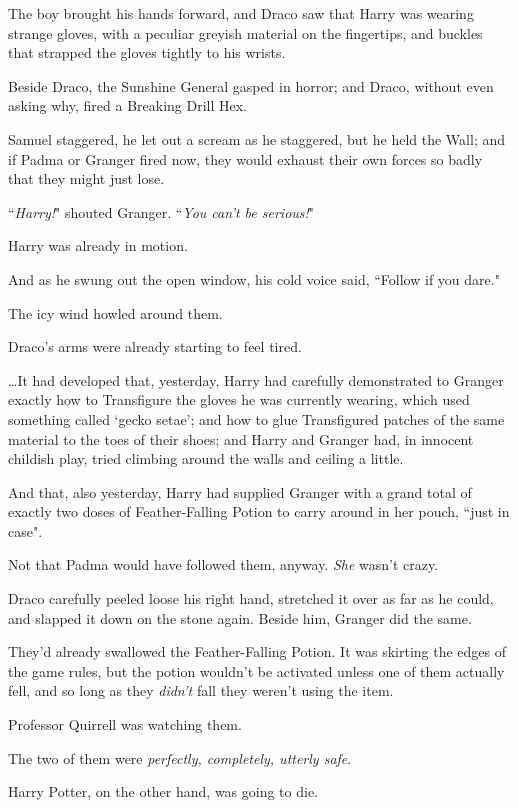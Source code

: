 The boy brought his hands forward, and Draco saw that Harry was wearing strange gloves, with a peculiar greyish material on the fingertips, and buckles that strapped the gloves tightly to his wrists.

Beside Draco, the Sunshine General gasped in horror; and Draco, without even asking why, fired a Breaking Drill Hex.

Samuel staggered, he let out a scream as he staggered, but he held the Wall; and if Padma or Granger fired now, they would exhaust their own forces so badly that they might just lose.

``\emph{Harry!}" shouted Granger. ``\emph{You can't be serious!}"

Harry was already in motion.

And as he swung out the open window, his cold voice said, ``Follow if you dare."

\later

The icy wind howled around them.

Draco's arms were already starting to feel tired.

{\ldots}It had developed that, yesterday, Harry had carefully demonstrated to Granger exactly how to Transfigure the gloves he was currently wearing, which used something called `gecko setae'; and how to glue Transfigured patches of the same material to the toes of their shoes; and Harry and Granger had, in innocent childish play, tried climbing around the walls and ceiling a little.

And that, also yesterday, Harry had supplied Granger with a grand total of exactly two doses of Feather-Falling Potion to carry around in her pouch, ``just in case".

Not that Padma would have followed them, anyway. \emph{She} wasn't crazy.

Draco carefully peeled loose his right hand, stretched it over as far as he could, and slapped it down on the stone again. Beside him, Granger did the same.

They'd already swallowed the Feather-Falling Potion. It was skirting the edges of the game rules, but the potion wouldn't be activated unless one of them actually fell, and so long as they \emph{didn't} fall they weren't using the item.

Professor Quirrell was watching them.

The two of them were \emph{perfectly, completely, utterly safe}.

Harry Potter, on the other hand, was going to die.

